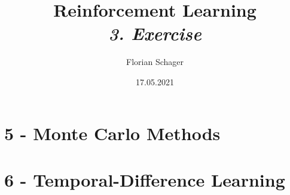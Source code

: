 \documentclass{article}
\title
{
  Reinforcement Learning \\
  \vspace{4pt}
  \normalsize
  \textit{3. Exercise}
}
\author
{
  Florian Schager
}
\date{17.05.2021}
\begin{document}
\maketitle

\section*{5 - Monte Carlo Methods}


\pagebreak






\section*{6 - Temporal-Difference Learning}








\end{document}
